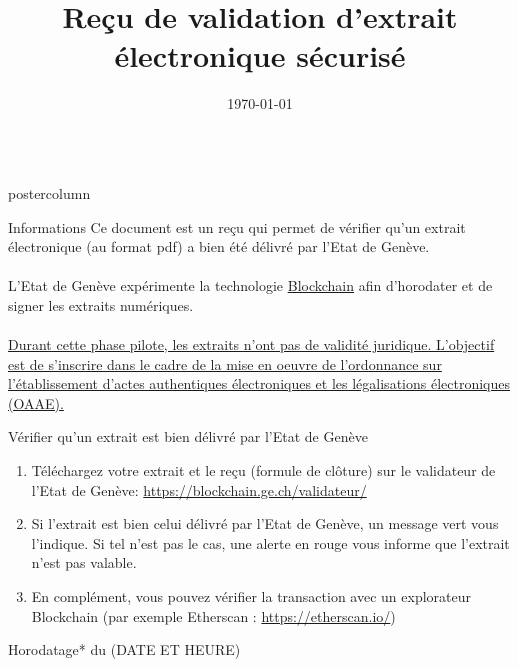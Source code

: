 \documentclass[roundedcorners=true, titleposition=center]{beamerthemeruhuisstijlposter}
\institute[CLS]{République et canton de Genève}
\title{Reçu de validation d’extrait électronique sécurisé}
\date{\today}
\begin{document}
\begin{frame}
\begin{columns}
\begin{column}{0.95\textwidth}
\begin{beamercolorbox}[center, wd=\textwidth]{postercolumn}
\begin{minipage}[T]{0.95\textwidth}
\parbox[t][\columnheight]{\textwidth}{%
  \begin{block}{Informations}
  	Ce document est un reçu qui permet de vérifier qu'un extrait électronique (au format pdf) a bien été délivré par l’Etat de Genève.
   \\
   \\
	L'Etat de Genève expérimente la technologie \href{https://demain.ge.ch/blog/geneve-lab/blockchain-presentee-discutee-lors-cafe-republique-numerique-22-03-2017}{Blockchain} afin d'horodater et de signer les extraits numériques.
\\
\\
	\ul{Durant cette phase pilote, les extraits n’ont pas de validité juridique.
L’objectif est de s’inscrire dans le cadre de la mise en oeuvre de l’ordonnance sur l’établissement d’actes authentiques électroniques et les légalisations électroniques (OAAE).}
  \end{block}
\medskip
\begin{block}{Vérifier qu'un extrait est bien délivré par l’Etat de Genève} 
\end{block}
\begin{enumerate}
\item Téléchargez votre extrait et le reçu (formule de clôture) sur le validateur de l’Etat de Genève: \url{https://blockchain.ge.ch/validateur/}
\item Si l’extrait est bien celui délivré par l’Etat de Genève, un message vert vous l’indique. Si tel n’est pas le cas, une alerte en rouge vous informe que l’extrait n’est pas valable.
\item  En complément, vous pouvez vérifier la transaction avec un explorateur Blockchain (par exemple  Etherscan : \url{https://etherscan.io/})
\end{enumerate}
  \medskip
    
  \begin{block}{Horodatage* du (DATE ET HEURE)}
 

\end{block}}
\end{minipage}
\end{beamercolorbox}
\end{column}
\end{columns}
\end{frame}
\end{document}
